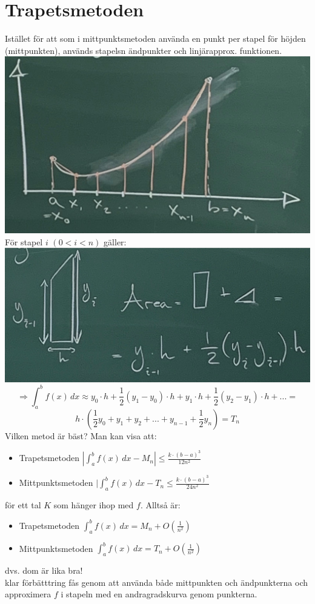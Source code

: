 \section{Trapetsmetoden}
Istället för att som i mittpunktsmetoden använda en punkt per stapel för höjden (mittpunkten), används stapelsn ändpunkter och linjärapprox. funktionen.\\
\includegraphics[scale=0.1]{lessons/lesson18/imgs/img06.jpg}\\
För stapel $i$ $(0<i<n)$ gäller:\\
\includegraphics[scale=0.1]{lessons/lesson18/imgs/img07.jpg}
\begin{equation*}
    \Rightarrow \int_a^b f(x)\, dx\approx
    y_0\cdot h+\frac{1}{2}(y_1-y_0)\cdot h+y_1\cdot h+\frac{1}{2}(y_2-y_1)\cdot h+...=
\end{equation*}
\begin{equation*}
    h\cdot(\frac{1}{2}y_0+y_1+y_2+...+y_{n-1}+\frac{1}{2}y_n)=T_n
\end{equation*}
Vilken metod är bäst?
Man kan visa att:
\begin{itemize}
    \item Trapetsmetoden $|\int_a^b f(x)\, dx-M_n|\leq \frac{k\cdot(b-a)^3}{12n^2}$
    \item Mittpunktsmetoden $|\int_a^b f(x)\, dx-T_n\leq\frac{k\cdot(b-a)^3}{24n^2}$
\end{itemize}
för ett tal $K$ som hänger ihop med $f$.
Alltså är:
\begin{itemize}
    \item Trapetsmetoden $\int_a^b f(x)\, dx=M_n+O(\frac{1}{n^2})$
    \item Mittpunktsmetoden $\int_a^b f(x)\, dx=T_n+O(\frac{1}{n^2})$
\end{itemize}
dvs. dom är lika bra!\\
klar förbätttring fås genom att använda både mittpunkten och ändpunkterna och approximera $f$ i stapeln med en andragradskurva genom punkterna.
